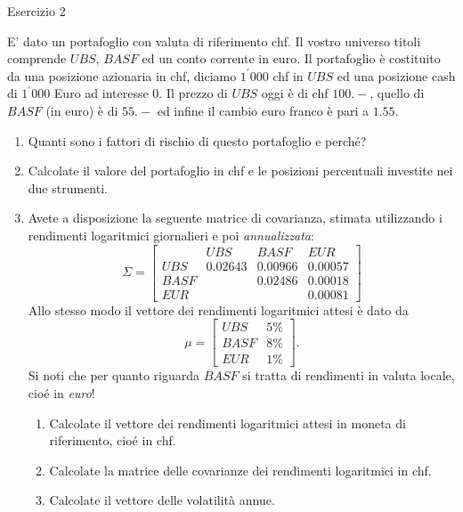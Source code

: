 \documentclass[a4paper,12pt]{article}
\begin{document}
{\Large Esercizio 2}

\bigskip

E' dato un portafoglio con valuta di riferimento chf. Il vostro universo
titoli comprende $UBS$, $BASF$ ed un conto corrente in euro. Il portafoglio 
\`{e} costituito da una posizione azionaria in chf, diciamo $1^{\prime }000$
chf in $UBS$ ed una posizione cash di $1^{\prime }000$ Euro ad interesse 0.
Il prezzo di $UBS$ oggi \`{e} di chf $100.-$, quello di $BASF$ (in euro) 
\`{e} di $55.-$ ed infine il cambio euro franco \`{e} pari a $1.55$.

\begin{enumerate}
\item Quanti sono i fattori di rischio di questo portafoglio e perch\'{e}?

\item Calcolate il valore del portafoglio in chf e le posizioni percentuali
investite nei due strumenti.

\item Avete a disposizione la seguente matrice di covarianza, stimata
utilizzando i rendimenti logaritmici giornalieri e poi \emph{annualizzata}:%
\[
\Sigma =\left[ 
\begin{array}{cccc}
& UBS & BASF & EUR \\ 
UBS & 0.02643 & 0.00966 & 0.00057 \\ 
BASF &  & 0.02486 & 0.00018 \\ 
EUR &  &  & 0.00081%
\end{array}%
\right] 
\]%
Allo stesso modo il vettore dei rendimenti logaritmici attesi \`{e} dato da%
\[
\mu =\left[ 
\begin{array}{cc}
UBS & 5\% \\ 
BASF & 8\% \\ 
EUR & 1\%%
\end{array}%
\right] .
\]%
Si noti che per quanto riguarda $BASF$ si tratta di rendimenti in valuta
locale, cio\'{e} in \emph{euro}!

\begin{enumerate}
\item Calcolate il vettore dei rendimenti logaritmici attesi in moneta di
riferimento, cio\'{e} in chf.

\item Calcolate la matrice delle covarianze dei rendimenti logaritmici in
chf.

\item Calcolate il vettore delle volatilit\`{a} annue.
\end{enumerate}


\end{enumerate}
\end{document}
